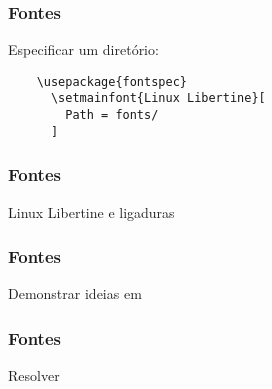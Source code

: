 \begin{frame}[fragile]
  \frametitle{Fontes}
  \Large
  Especificar um diretório:

  \begin{verbatim}
    \usepackage{fontspec}
      \setmainfont{Linux Libertine}[
        Path = fonts/
      ]
  \end{verbatim}
\end{frame}

\begin{frame}
  \frametitle{Fontes}
  \Huge
  Linux Libertine e ligaduras

\end{frame}

\begin{frame}
  \frametitle{Fontes}
  \huge
  Demonstrar ideias em 
\end{frame}

\begin{frame}
  \frametitle{Fontes}
  \huge
  Resolver 
\end{frame}
